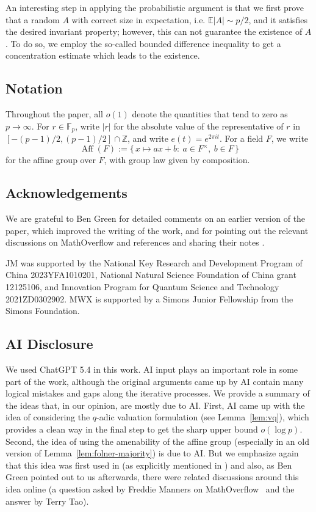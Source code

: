 \documentclass[11pt,letterpaper,reqno]{amsart}
\theoremstyle{definition}
\newcommand{\F}{\mathbb F}
\newcommand{\Z}{\mathbb Z}
\newcommand{\1}{\mathbf 1}
\DeclareMathOperator{\Aff}{Aff}
\begin{document}
An interesting step in applying the probabilistic argument is that we first prove that a random $A$ with correct size in expectation, i.e. $\mathbb{E}|A|\sim p/2$, and it satisfies the desired invariant property; however, this can not guarantee the existence of $A$. To do so, we employ the so-called bounded difference inequality to get a concentration estimate which leads to the existence.    

\subsection*{Notation}
Throughout the paper, all $o(1)$ denote the quantities that tend to zero as $p\to\infty$. 
For $r\in\F_p$, write $|r|$ for the absolute value of the representative of $r$ in
$[-(p-1)/2,(p-1)/2]\cap\Z$, and write $e(t)=e^{2\pi i t}$. For a field \(F\), we write
\[
        \Aff(F):=\{\,x\mapsto ax+b:\ a\in F^\times,\ b\in F\,\}
\]
for the affine group over \(F\), with group law given by composition.

\subsection*{Acknowledgements}
We are grateful to Ben Green for detailed comments on an earlier version of the paper, which improved the writing of the work, and for pointing out the relevant discussions on MathOverflow \cite{MOQ, MOA} and references \cite{green2003constructions, Pete2020} and sharing their notes \cite{notes}.

JM was supported by the National Key Research and Development Program of China 2023YFA1010201, National Natural Science Foundation of China grant
12125106, and Innovation Program for Quantum Science and Technology 2021ZD0302902.  
MWX is supported by a Simons Junior Fellowship from the Simons Foundation. 
   
\subsection*{AI Disclosure} We used ChatGPT 5.4 in this work.
AI input plays an important role in some part of the work, although the original arguments came up by AI contain many logical mistakes and gaps along the iterative processes. We provide a summary of the ideas that, in our opinion, are mostly due to AI. First, AI came up with the idea of considering the $q$-adic valuation formulation (see Lemma~\ref{lem:vq}), which provides a clean way in the final step to get the sharp upper bound $o(\log p)$. Second, the idea of using the amenability of the affine group
(especially in an old version of Lemma~\ref{lem:folner-majority}) is due to AI. But we emphasize again that this idea was first used in \cite{notes} (as explicitly mentioned in \cite{GreenProblems}) and also, as Ben Green pointed out to us afterwards, there were related discussions around this idea online (a question asked by Freddie Manners on MathOverflow~\cite{MOQ} and the answer \cite{MOA} by Terry Tao). 
   
\end{document}

